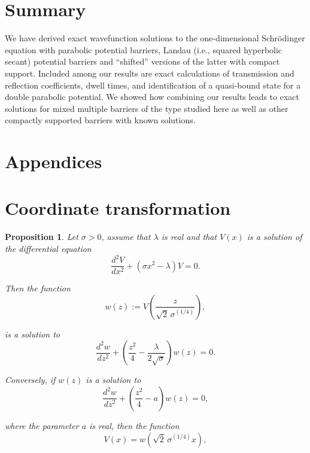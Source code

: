 \documentclass{article}
\newtheorem{proposition}{Proposition}
\numberwithin{equation}{section}
\begin{document}
{\newpage

\section{Summary}\label{sum}

We have derived exact wavefunction solutions to the one-dimensional Schr\"{o}dinger equation with parabolic potential barriers, Landau (i.e., squared hyperbolic secant) potential barriers and ``shifted'' versions of the latter with compact support.  Included among our results are exact calculations of transmission and reflection coefficients, dwell times, and identification of a quasi-bound state for a double parabolic potential. We showed how combining our results leads to exact solutions for mixed multiple barriers of the type studied here as well as other compactly supported barriers with known solutions.
 
\section*{Appendices}\label{App}
\appendix
\section{Coordinate transformation}\label{ct}

\begin{proposition}
Let $\sigma>0$, assume that $\lambda$ is real and that $V(x)$ is a solution of the differential equation
\begin{equation}
\frac{d^2 V}{dx^2}+ (\sigma x^2 - \lambda)V=0.\label{1}
\end{equation}

Then the function 
\begin{equation}
w(z):=V\left(\frac{z}{\sqrt{2}\,\sigma^{(1/4)}}\right),\label{2}
\end{equation}

is a solution to
\begin{equation}
\frac{d^2 w}{dz^2}+\left(\frac{z^2}{4}-\frac{\lambda}{2\sqrt{\sigma}}\right)\!w(z)=0.\label{3}
\end{equation}

Conversely, if $w(z)$ is a solution to
\begin{equation}
\frac{d^2 w}{dz^2}+\left(\frac{z^2}{4}-a\right)w(z)=0,\label{4}
\end{equation}

where the parameter $a$ is real, then the function
\begin{equation}
V(x)=w(\sqrt{2}\,\sigma^{(1/4)}x),\label{5}
\end{equation}


\end{proposition}}
\end{document}
